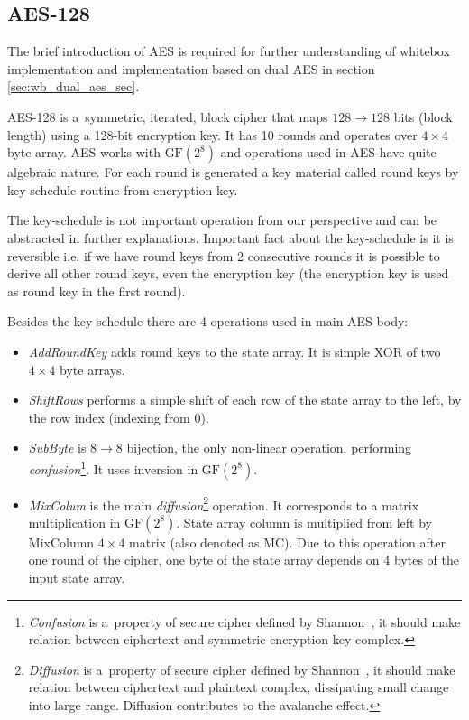 \documentclass[11pt,oneside,final]{fithesis2}
\newcommand{\gfe}{\ensuremath{\text{GF}\left(2^8\right)}}
\begin{document}
    \subsection{AES-128}
    The brief introduction of AES is required for further understanding of whitebox implementation and implementation based on dual AES in section \ref{sec:wb_dual_aes_sec}.
    
    AES-128 is a~symmetric, iterated, block cipher that maps $128 \rightarrow 128$ bits (block length) using a 128-bit encryption key. It has 10 rounds and operates
    over $4\times4$ byte array. AES works with $\gfe$ and operations used in AES have quite algebraic nature. For each round is generated a key material called round keys
    by key-schedule routine from encryption key. 
    
    The key-schedule is not important operation from our perspective and can be abstracted in further explanations. Important fact about the key-schedule is it is reversible i.e. 
    if we have round keys from 2 consecutive rounds it is possible to derive all other round keys, even the encryption key (the encryption key is used as round key in the first round).
    
    Besides the key-schedule there are 4 operations used in main AES body:
    \begin{itemize}
     \item \emph{AddRoundKey} adds round keys to the state array. It is simple XOR of two $4\times4$ byte arrays.
     \item \emph{ShiftRows} performs a simple shift of each row of the state array to the left, by the row index (indexing from 0).
     \item \emph{SubByte} is $8 \rightarrow 8$ bijection, the only non-linear operation, performing 
	\emph{confusion}\footnote{\emph{Confusion} is a~property of secure cipher defined by Shannon~\citep{shannon-otp}, it should make relation between ciphertext and symmetric encryption
	    key complex.}. It uses inversion in $\gfe$.
     \item \emph{MixColum} is the main \emph{diffusion}\footnote{\emph{Diffusion} is a~property of secure cipher defined by Shannon~\citep{shannon-otp}, it should make relation between
	    ciphertext and plaintext complex, dissipating small change into large range. Diffusion contributes to the avalanche effect. } operation. It corresponds to a matrix multiplication in $\gfe$. 
	    State array column is multiplied from left by MixColumn $4 \times 4$ matrix (also denoted as MC). Due to this operation after one round of the cipher, 
	    one byte of the state array depends on 4 bytes of the input state array.
    \end{itemize}
    
\end{document}

